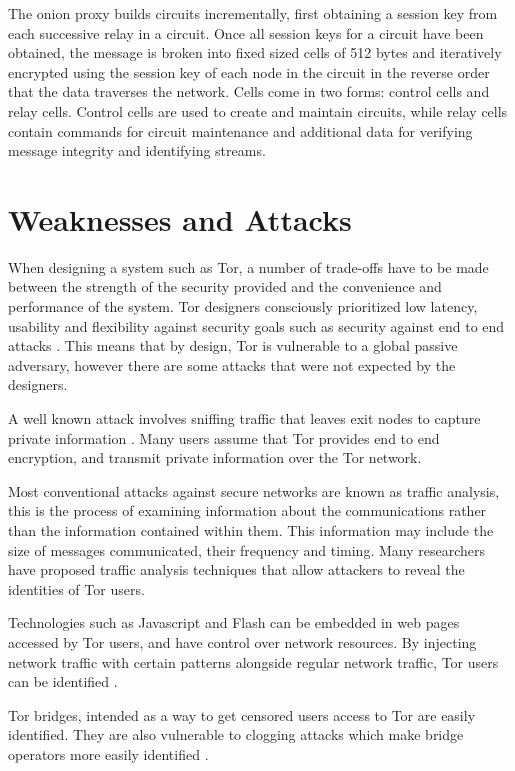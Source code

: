 \documentclass[conference]{IEEEtran}
\begin{document}
The onion proxy builds circuits incrementally, first obtaining a session key
from each successive relay in a circuit. Once all session keys for a circuit
have been obtained, the message is broken into fixed sized cells of 512 bytes
and iteratively encrypted using the session key of each node in the circuit in
the reverse order that the data traverses the network. Cells come in two forms:
control cells and relay cells. Control cells are used to create and maintain
circuits, while relay cells contain commands for circuit maintenance and
additional data for verifying message integrity and identifying streams.

\section{Weaknesses and Attacks}

When designing a system such as Tor, a number of trade-offs have to be made
between the strength of the security provided and the convenience and
performance of the system. Tor designers consciously prioritized low latency,
usability and flexibility against security goals such as security against end
to end attacks \parencite[4]{Dingledine:2004p314}. This means that by design,
Tor is vulnerable to a global passive adversary, however there are some attacks
that were not expected by the designers.

A well known attack involves sniffing traffic that leaves exit nodes to
capture private information \parencite{website:tor-password-leak}. Many users
assume that Tor provides end to end encryption, and transmit private information
over the Tor network.

Most conventional attacks against secure networks are known as traffic analysis,
this is the process of examining information about the communications rather
than the information contained within them. This information may include the
size of messages communicated, their frequency and timing. Many researchers have
proposed traffic analysis techniques that allow attackers to reveal the
identities of Tor users.

Technologies such as Javascript and Flash can be embedded in web pages accessed
by Tor users, and have control over network resources. By injecting network
traffic with certain patterns alongside regular network traffic, Tor users can
be identified \parencite{Abbott:2007p298}.

Tor bridges, intended as a way to get censored users access to Tor are easily
identified. They are also vulnerable to clogging attacks which make bridge
operators more easily identified \textcite{McLachlan:2009p197}.
\end{document}
